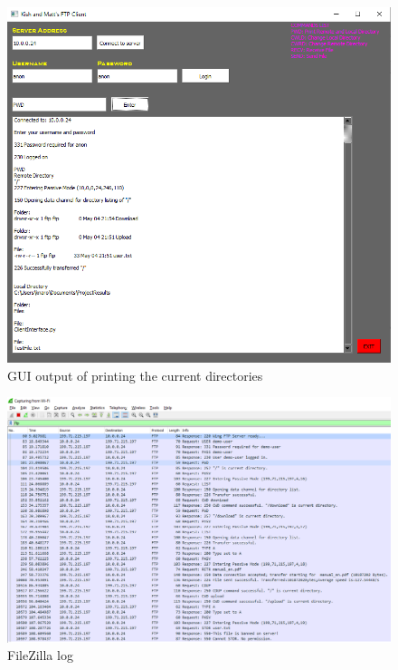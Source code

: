 \documentclass[10pt, conference]{IEEEtran}
\begin{document}
\begin{appendices}
\begin{figure}[h!]
\renewcommand{\thefigure}{\arabic{figure}}
\centering
\includegraphics[scale=0.8]{FileZillaGUI.png}
\caption{GUI output of printing the current directories}
\label{fig: FileZilla GUI}
\end{figure}

\begin{figure}[h!]
\renewcommand{\thefigure}{\arabic{figure}}
\centering
\includegraphics[scale=0.55]{WftpWireshark.png}
\caption{FileZilla log}
\label{fig: Wftp Wireshark}
\end{figure}


\end{appendices}
\end{document}
